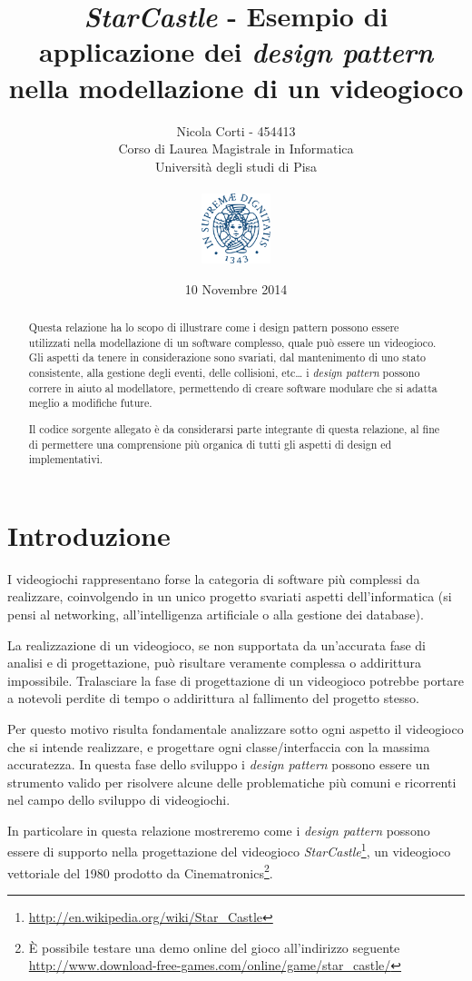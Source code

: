 \documentclass[a4paper,12pt]{article}
\title{\emph{StarCastle} - Esempio di applicazione dei \emph{design pattern} nella modellazione di un videogioco}
\author{Nicola Corti - 454413 \\Corso di Laurea Magistrale in Informatica \\ Universit\`a degli studi di Pisa \\ \\ \includegraphics[width=2cm]{unipi.pdf}}
\date{10 Novembre 2014}
\begin{document}
\maketitle

\begin{abstract}
Questa relazione ha lo scopo di illustrare come i design pattern possono essere utilizzati nella modellazione di un software complesso, quale pu\`o essere un videogioco. Gli aspetti da tenere in considerazione sono svariati, dal mantenimento di uno stato consistente, alla gestione degli eventi, delle collisioni, etc\dots{} i \emph{design pattern} possono correre in aiuto al modellatore, permettendo di creare software modulare che si adatta meglio a modifiche future.

Il codice sorgente allegato \`e da considerarsi parte integrante di questa relazione, al fine di permettere una comprensione pi\`u organica di tutti gli aspetti di design ed implementativi.
\end{abstract}
\newpage

\tableofcontents
\newpage

\section*{Introduzione}
\label{sec:introduzione}

I videogiochi rappresentano forse la categoria di software pi\`u complessi da realizzare, coinvolgendo in un unico progetto svariati aspetti dell'informatica (si pensi al networking, all'intelligenza artificiale o alla gestione dei database).

La realizzazione di un videogioco, se non supportata da un'accurata fase di analisi e di progettazione, pu\`o risultare veramente complessa o addirittura impossibile. Tralasciare la fase di progettazione di un videogioco potrebbe portare a notevoli perdite di tempo o addirittura al fallimento del progetto stesso.

Per questo motivo risulta fondamentale analizzare sotto ogni aspetto il videogioco che si intende realizzare, e progettare ogni classe/interfaccia con la massima accuratezza. In questa fase dello sviluppo i \emph{design pattern} possono essere un strumento valido per risolvere alcune delle problematiche pi\`u comuni e ricorrenti nel campo dello sviluppo di videogiochi.

In particolare in questa relazione mostreremo come i \emph{design pattern} possono essere di supporto nella progettazione del videogioco \emph{StarCastle}\footnote{\url{http://en.wikipedia.org/wiki/Star_Castle}}, un videogioco vettoriale del 1980 prodotto da Cinematronics\footnote{\`E possibile testare una demo online del gioco all'indirizzo seguente \\ \url{http://www.download-free-games.com/online/game/star_castle/}}.
\end{document}
